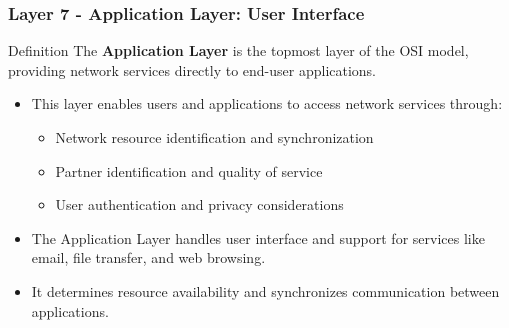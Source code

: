 \documentclass{beamer}
\begin{document}
\begin{frame}
    \frametitle{Layer 7 - Application Layer: User Interface}
    
    \begin{alertblock}{Definition}
        The \textbf{Application Layer} is the topmost layer of the OSI model, providing network services directly to end-user applications.
    \end{alertblock}
    
    \begin{itemize}
        \item This layer enables users and applications to access network services through:
        \begin{itemize}
            \item Network resource identification and synchronization
            \item Partner identification and quality of service
            \item User authentication and privacy considerations
        \end{itemize}
        
        \item The Application Layer handles user interface and support for services like email, file transfer, and web browsing.
        
        \item It determines resource availability and synchronizes communication between applications.
    \end{itemize}
\end{frame}
\end{document}
